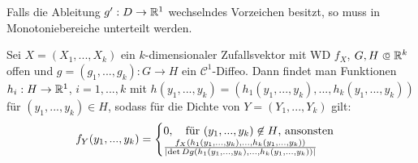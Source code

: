 \documentclass{cheat-sheet}
\newcommand{\E}{\mathbb{E}} %
\begin{document}
\iffalse
  \begin{bsp}
    $Y = e^{N (\mu, \sigma^2)} + c$

    Dann heißt $Y$ logarithmisch normalverteilt

    $g(x) = e^x + c$

    Ausgelassen: Rechnungen
  \end{bsp}
\fi



\begin{bem}
  Falls die Ableitung $g' : D \to \mathbb{R}^1$ wechselndes Vorzeichen besitzt, so muss in Monotoniebereiche unterteilt werden.
\end{bem}

\iffalse
  \begin{bsp}
    $Y = e^{N(\mu, \sigma^2) + c}$, speziell $\mu = 0$, $\sigma^2 = 1$, $c = 0$, dann
    \[ f_Y(y) = \frac{1}{\sqrt{2 \pi}} \exp(- \frac{(\log y)^2}{2}). \]
  \end{bsp}


  Die Funktion
  \[ f_a(y) \coloneqq f_Y(y) \cdot (1 + a \cdot \sin(2 \pi \log y)), y \in \R_{>0}^1, a \in \cinterval{0}{1} \]

  Für $a \in \cinterval{0}{1}$ ist dann $\Int{-\infty}{\infty}{f_a(y)}{y} = 1$

  \[ \E Y^n = \Int{0}{\infty}{y^n f_Y(y)}{y} = ... = \exp(- \frac{n^2}{2}) \]

  und

  \[ \Int{0}{\infty}{y^n f_a(y)}{y} = \exp(- \frac{n^2}{2}) \]
\fi



\iffalse
  Sei $X = (X_1, ..., X_k)$ ein $k$-dimensionaler Zufallsvektor,
  $g = (g_1, ..., g_k) : \R^k \to \R^k$ mit $g_i : \R^k \to \R^1$ für $i = 1, ..., k$ Borel-messbar.
  Dann ist $Y = g(X)$ ein $k$-dimensionaler ZV mit $P_Y = P_X \circ g^{-1}$
  Falls $f_{(X_1, ..., X_k)}$ eine W-Dichte von $X$ ist und $g$ ein $\mathcal{C}^1$-Diffeomorphismus ist, dann existiert die W-Dichte von $f_{(Y_1, ..., Y_k)}$ von $Y$.
\fi

\begin{satz}
  Sei $X = (X_1, ..., X_k)$ ein $k$-dimensionaler Zufallsvektor mit WD $f_X$, $G, H \opn \R^k$ offen und $g = (g_1, ..., g_k) : G \to H$ ein $\mathcal{C}^1$-Diffeo.
  Dann findet man Funktionen $h_i : H \to \mathbb{R}^1$, $i = 1, ..., k$ mit $h(y_1, ..., y_k) = (h_1(y_1, ..., y_k), ..., h_k(y_1, ..., y_k))$ für $(y_1, ..., y_k) \in H$, sodass für die Dichte von $Y = (Y_1, ..., Y_k)$ gilt:
  \[
    f_{Y}(y_1, ..., y_k) = \begin{cases}
      0, \quad \text{für $(y_1, ..., y_k) \not\in H$, ansonsten} \\
      \tfrac{f_{X}(h_1(y_1, ..., y_k), ..., h_k(y_1, ..., y_k))}{\lvert\det D g(h_1(y_1, ..., y_k), ..., h_k(y_1, ..., y_k))\rvert}
    \end{cases}
  \]
\end{satz}
\end{document}
